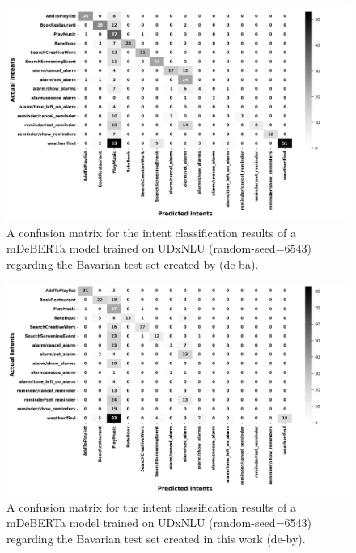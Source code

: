 \documentclass[11pt,a4paper,twoside,openright]{scrbook}
\begin{document}
\begin{figure}[!ht]
    \centering
    \includegraphics[width=\textwidth]{ma_figures/de-ba_UDxNLU.png}
    \caption{A confusion matrix for the intent classification results of a mDeBERTa model trained on UDxNLU (random-seed=6543) regarding the Bavarian test set created by \citet{winkler-etal-2024-slot-intent} (de-ba).}
    \label{fig:de-ba_UDxNLU}
\end{figure}

\begin{figure}[!ht]
    \centering
    \includegraphics[width=\textwidth]{ma_figures/de-by_UDxNLU.png}
    \caption{A confusion matrix for the intent classification results of a mDeBERTa model trained on UDxNLU (random-seed=6543) regarding the Bavarian test set created in this work (de-by).}
    \label{fig:de-by_UDxNLU}
\end{figure}
\end{document}
